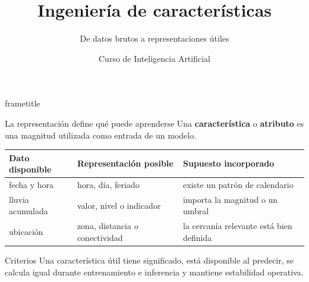 \documentclass[aspectratio=169,10pt]{beamer}
\title[IA · Clase 6]{Ingeniería de características}
\subtitle{De datos brutos a representaciones útiles}
\author{Curso de Inteligencia Artificial}
\institute{Semana 6 · Clase 6}
\date{}
\newcommand{\concepto}[1]{\textcolor{UAPTeal}{\textbf{#1}}}
\begin{document}
\begin{frame}[plain]
  \begin{beamercolorbox}[wd=\paperwidth,ht=\paperheight,sep=2em]{frametitle}
    \vfill
    {\Huge\inserttitle\par}
    \vspace{1em}
    \par
    \vfill {\color{UAPGold}\large\insertauthor\par}{\color{white}\insertinstitute\par}
  \end{beamercolorbox}
\end{frame}

\begin{frame}{La representación define qué puede aprenderse}
  \footnotesize
  Una \concepto{característica} o \concepto{atributo} es una magnitud utilizada como entrada de un modelo.
  \begin{tabularx}{\textwidth}{p{} p{} X}
    \toprule Dato disponible & Representación posible & Supuesto incorporado \\ \midrule
    fecha y hora & hora, día, feriado & existe un patrón de calendario \\
    lluvia acumulada & valor, nivel o indicador & importa la magnitud o un umbral \\
    ubicación & zona, distancia o conectividad & la cercanía relevante está bien definida \\
    \bottomrule
  \end{tabularx}
  \begin{block}{Criterios}
    Una característica útil tiene significado, está disponible al predecir, se calcula igual durante entrenamiento e inferencia y mantiene estabilidad operativa.
  \end{block}
\end{frame}
\end{document}
